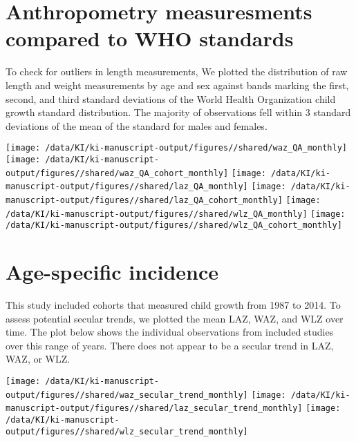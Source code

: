 \documentclass[
  9pt,
]{book}
\begin{document}
\raggedright

\hypertarget{anthropometry-measuresments-compared-to-who-standards}{%
\section{Anthropometry measuresments compared to WHO standards}\label{anthropometry-measuresments-compared-to-who-standards}}

To check for outliers in length measurements, We plotted the distribution of raw length and weight measurements by age and sex against bands marking the first, second, and third standard deviations of the World Health Organization child growth standard distribution. The majority of observations fell within 3 standard deviations of the mean of the standard for males and females.

\texttt{[image: /data/KI/ki-manuscript-output/figures//shared/waz\_QA\_monthly]}
\texttt{[image: /data/KI/ki-manuscript-output/figures//shared/waz\_QA\_cohort\_monthly]}
\texttt{[image: /data/KI/ki-manuscript-output/figures//shared/laz\_QA\_monthly]}
\texttt{[image: /data/KI/ki-manuscript-output/figures//shared/laz\_QA\_cohort\_monthly]}
\texttt{[image: /data/KI/ki-manuscript-output/figures//shared/wlz\_QA\_monthly]}
\texttt{[image: /data/KI/ki-manuscript-output/figures//shared/wlz\_QA\_cohort\_monthly]}

\hypertarget{age-specific-incidence-2}{%
\section{Age-specific incidence}\label{age-specific-incidence-2}}

This study included cohorts that measured child growth from 1987 to 2014. To assess potential secular trends, we plotted the mean LAZ, WAZ, and WLZ over time. The plot below shows the individual observations from included studies over this range of years. There does not appear to be a secular trend in LAZ, WAZ, or WLZ.

\texttt{[image: /data/KI/ki-manuscript-output/figures//shared/waz\_secular\_trend\_monthly]}
\texttt{[image: /data/KI/ki-manuscript-output/figures//shared/laz\_secular\_trend\_monthly]}
\texttt{[image: /data/KI/ki-manuscript-output/figures//shared/wlz\_secular\_trend\_monthly]}

  
\end{document}

